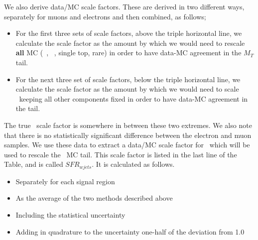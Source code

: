 We also derive data/MC scale factors.
These are derived in two different ways, separately for muons and
electrons and then combined, as follows;
\begin{itemize}
\item For the first three sets of scale factors, above the triple horizontal
  line, we calculate the scale factor as the amount by which we would
  need to rescale {\bf all} MC (\wjets\ , \ttbar\ , single top, rare) in
  order to have data-MC agreement in the $M_T$ tail.
\item For the next three set of scale factors, below the triple horizontal
line, we calculate the scale factor as the amount by which we would
need 
to scale \wjets\ keeping all other 
components fixed in order to have data-MC agreement in the tail.
\end{itemize}
\noindent  The true \wjets\ scale factor is somewhere in between these
two extremes.  We also note that there is no statistically significant
difference between the electron and muon samples.  We use these data
to extract a data/MC scale factor for \wjets\ which will be used to
rescale the \wjets\ MC tail.  This scale factor is listed in the last
line of the Table, and is called $SFR_{wjets}$.  It is calculated as
follows.
\begin{itemize}
\item Separately for each signal region
\item As the average of the two methods described above
\item Including the statistical uncertainty
\item Adding in quadrature to the uncertainty one-half of the
  deviation from 1.0
\end{itemize}

 




